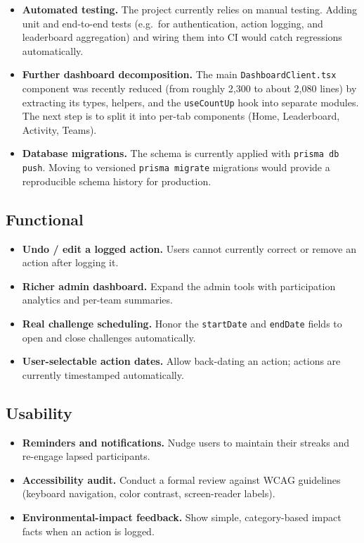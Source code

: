 \documentclass[12pt]{article}
\begin{document}
\begin{itemize}
    \item \textbf{Automated testing.} The project currently relies on manual
    testing. Adding unit and end-to-end tests (e.g.\ for authentication, action
    logging, and leaderboard aggregation) and wiring them into CI would catch
    regressions automatically.
    \item \textbf{Further dashboard decomposition.} The main
    \texttt{DashboardClient.tsx} component was recently reduced (from roughly
    2,300 to about 2,080 lines) by extracting its types, helpers, and the
    \texttt{useCountUp} hook into separate modules. The next step is to split
    it into per-tab components (Home, Leaderboard, Activity, Teams).
    \item \textbf{Database migrations.} The schema is currently applied with
    \texttt{prisma db push}. Moving to versioned \texttt{prisma migrate}
    migrations would provide a reproducible schema history for production.
\end{itemize}

\subsection{Functional}

\begin{itemize}
    \item \textbf{Undo / edit a logged action.} Users cannot currently correct
    or remove an action after logging it.
    \item \textbf{Richer admin dashboard.} Expand the admin tools with
    participation analytics and per-team summaries.
    \item \textbf{Real challenge scheduling.} Honor the \texttt{startDate} and
    \texttt{endDate} fields to open and close challenges automatically.
    \item \textbf{User-selectable action dates.} Allow back-dating an action;
    actions are currently timestamped automatically.
\end{itemize}

\subsection{Usability}

\begin{itemize}
    \item \textbf{Reminders and notifications.} Nudge users to maintain their
    streaks and re-engage lapsed participants.
    \item \textbf{Accessibility audit.} Conduct a formal review against WCAG
    guidelines (keyboard navigation, color contrast, screen-reader labels).
    \item \textbf{Environmental-impact feedback.} Show simple, category-based
    impact facts when an action is logged.
\end{itemize}
\end{document}
